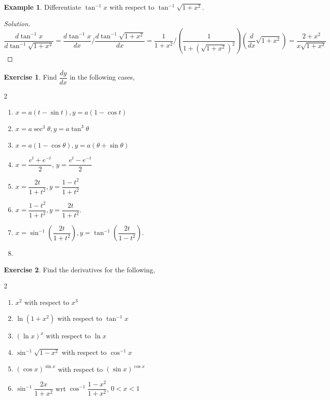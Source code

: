 \documentclass[../../main.tex]{subfiles}
\theoremstyle{definition}
\newtheorem{exercise}{Exercise}[section]
\newtheorem{example}{Example}[section]
\newenvironment{solution}
    {\begin{proof}[Solution]}
    {\end{proof}}
\begin{document}
\begin{example}
Differentiate $\tan^{-1} x$ with respect to $\tan^{-1}\sqrt{1+x^2}$.    
\end{example}

\begin{solution}
\[
\frac{d\tan^{-1} x}{d\tan^{-1}\sqrt{1+x^2}} = \frac{d\tan^{-1} x}{dx}/\frac{d\tan^{-1}\sqrt{1+x^2}}{dx} = \frac{1}{1+x^2}/(\frac{1}{1+(\sqrt{1+x^2})^2})(\dfrac{d}{dx}\sqrt{1+x^2})=\frac{2+x^2}{x\sqrt{1+x^2}}
\]

\end{solution}

\begin{exercise}
Find $\dfrac{dy}{dx}$ in the following cases,
\begin{multicols}{2}
\begin{enumerate}[label=(\roman*)]
    \item $x=a(t-\sin t),y=a(1-\cos t)$
    \item $x=a\sec^3 \theta ,y=a\tan^3 \theta$
    \item $x=a(1-\cos \theta), y=a(\theta+\sin \theta)$    
    \item $x=\dfrac{e^t+e^{-t}}{2}$, $y=\dfrac{e^t-e^{-t}}{2}$ 
    \item $x=\dfrac{2t}{1+t^2}, y=\dfrac{1-t^2}{1+t^2}$
    \item $x=\dfrac{1-t^2}{1+t^2}, y=\dfrac{2t}{1+t^2}$.
    \item $x=\sin^{-1}(\dfrac{2t}{1+t^2}), y=\tan^{-1}(\dfrac{2t}{1-t^2})$.
    \item[] \phantom{x}
\end{enumerate}
\end{multicols}
\end{exercise}

\begin{exercise}
Find the derivatives for the following,
\begin{multicols}{2}
\begin{enumerate}[label=(\roman*)]
    \item $x^2$ with respect to $x^3$
    \item $\ln(1+x^2)$ with respect to $\tan^{-1} x$
    \item $(\ln x)^x$ with respect to $\ln x$
    \item $\sin^{-1}\sqrt{1-x^2}$ with respect to $\cos^{-1} x$ 
    \item $(\cos x)^{\sin x}$ with respect to $(\sin x)^{\cos x}$
    \item $\sin^{-1}\dfrac{2x}{1+x^2}$ wrt $\cos^{-1}\dfrac{1-x^2}{1+x^2}$, $0<x<1$   
\end{enumerate}    
\end{multicols}
\end{exercise}
\end{document}
